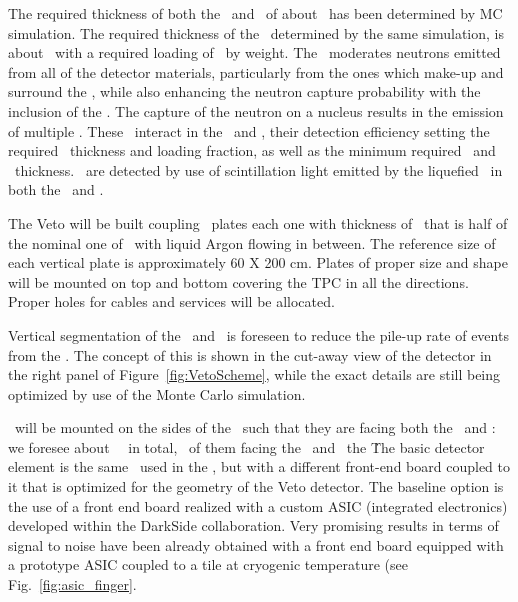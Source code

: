 The required thickness of both the \IAB\ and \OAB\ of about \DSkVetoOABThickness\ has been determined by MC simulation. The required thickness of the \GdAS\, determined by the same simulation,  is about \DSkVetoGdASThickness\ with a required  loading of \DSkVetoGdPercentage\ by weight.  The \GdAS\ moderates neutrons emitted from all of the detector materials, particularly from the ones which make-up and surround the \LArTPC, while also enhancing the neutron capture probability with the inclusion of the .  The capture of the neutron on a  nucleus results in the emission of multiple \grs.  These \grs\ interact in the \IAB\ and \OAB, their detection efficiency setting the required \GdAS\ thickness and  loading fraction, as well as the minimum required \IAB\ and \OAB\ thickness.  \grs\ are detected by use of scintillation light emitted by the liquefied \AAr\ in both the \IAB\ and \OAB. 

The Veto will be built coupling \GdAS\ plates each one with thickness of \DSkVetoGdAsSheetThickness\, that is half of the nominal one of \DSkVetoGdASThickness\, with liquid Argon flowing in between. The reference size of each vertical plate is approximately 60 X 200 cm. Plates of proper size and shape will be mounted on top and bottom covering the TPC in all the directions.
Proper holes for cables and services will be allocated.

Vertical segmentation of the \IAB\ and \OAB\ is foreseen to reduce the pile-up rate of  events from the \AAr.  The concept of this is shown in the cut-away view of the detector in the right panel of Figure~\ref{fig:VetoScheme}, while the exact details are still being optimized by use of the Monte Carlo simulation. 

\SiPMs\ will be mounted on the sides of the \GdAS\ such that they are facing both the \IAB\ and \OAB: we foresee about \DSkVetoTotalPDMs\ \SiPMs\ in total, \DSkVetoIABPDMs\ of them facing the \IAB\ and \DSkVetoOABPDMs\ the \OAB\. The basic detector element is the same \DSkPdm\ used in the \TPC, but with a different front-end board coupled to it that is optimized for the geometry of the Veto detector. 
The baseline option is the use of a front end board realized with a custom ASIC (integrated electronics) developed
within the DarkSide collaboration.
 Very promising results in terms of signal to noise have been already obtained with 
a front end board equipped with a prototype ASIC coupled to a tile at cryogenic temperature (see Fig.~\ref{fig:asic_finger}.

